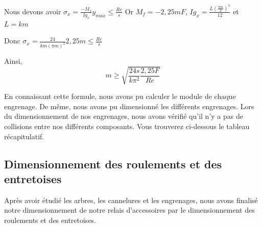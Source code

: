 \documentclass{config}
\begin{document}
\begin{spacing}{1.2}
Nous devons avoir $\sigma_{x} = \frac{- M_f}{Ig_x} y_{max} \leq \frac{Re}{s}$
Or $M_f = -2,25 mF $,  $ Ig_x =\frac{L (\frac{\pi m}{2})^3}{12}$ et $L = k m$

Donc $\sigma_{x} = \frac{24}{k m (\pi m)^2} 2,25m \leq \frac{Re}{s} $

Ainsi, \[ m \geq \sqrt{\frac{24 s}{ k \pi^2}\frac{2,25F}{Re}}\]

En connaissant cette formule, nous avons pu calculer le module de chaque engrenage. De même, nous avons pu dimensionné les différents engrenages. Lors du dimensionnement de nos engrenages, nous avons vérifié qu'il n'y a pas de collisions entre nos différents composants. Vous trouverez ci-dessous le tableau récapitulatif.


\begin{table}[h]
\centering
{}
\end{table}


\newpage
\subsection{Dimensionnement des roulements et des entretoises}

Après avoir étudié les arbres, les cannelures et les engrenages, nous avons finalisé notre dimensionnement de notre relais d'accessoires par le dimensionnement des roulements et des entretoises.


\end{spacing}
\end{document}

